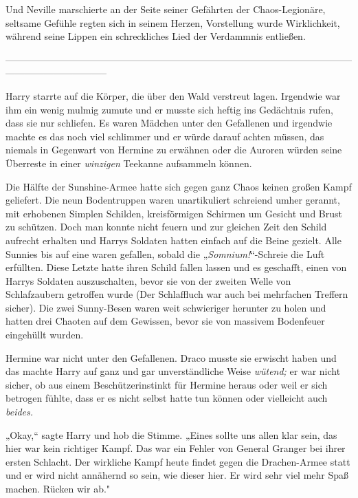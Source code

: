 {Und Neville marschierte an der Seite seiner Gefährten der Chaos-Legionäre, seltsame Gefühle regten sich in seinem Herzen, Vorstellung wurde Wirklichkeit, während seine Lippen ein schreckliches Lied der Verdammnis entließen.

--------------------------------------------------------------------------------------------------------------------------------------------

\hfill\break Harry starrte auf die Körper, die über den Wald verstreut lagen. Irgendwie war ihm ein wenig mulmig zumute und er musste sich heftig ins Gedächtnis rufen, dass sie nur schliefen. Es waren Mädchen unter den Gefallenen und irgendwie machte es das noch viel schlimmer und er würde darauf achten müssen, das niemals in Gegenwart von Hermine zu erwähnen oder die Auroren würden seine Überreste in einer \emph{winzigen} Teekanne aufsammeln können.

Die Hälfte der Sunshine-Armee hatte sich gegen ganz Chaos keinen großen Kampf geliefert. Die neun Bodentruppen waren unartikuliert schreiend umher gerannt, mit erhobenen Simplen Schilden, kreisförmigen Schirmen um Gesicht und Brust zu schützen. Doch man konnte nicht feuern und zur gleichen Zeit den Schild aufrecht erhalten und Harrys Soldaten hatten einfach auf die Beine gezielt. Alle Sunnies bis auf eine waren gefallen, sobald die „\emph{Somnium!}“-Schreie die Luft erfüllten. Diese Letzte hatte ihren Schild fallen lassen und es geschafft, einen von Harrys Soldaten auszuschalten, bevor sie von der zweiten Welle von Schlafzaubern getroffen wurde (Der Schlaffluch war auch bei mehrfachen Treffern sicher). Die zwei Sunny-Besen waren weit schwieriger herunter zu holen und hatten drei Chaoten auf dem Gewissen, bevor sie von massivem Bodenfeuer eingehüllt wurden.

Hermine war nicht unter den Gefallenen. Draco musste sie erwischt haben und das machte Harry auf ganz und gar unverständliche Weise \emph{wütend;} er war nicht sicher, ob aus einem Beschützerinstinkt für Hermine heraus oder weil er sich betrogen fühlte, dass er es nicht selbst hatte tun können oder vielleicht auch \emph{beides.}

„Okay,“ sagte Harry und hob die Stimme. „Eines sollte uns allen klar sein, das hier war kein richtiger Kampf. Das war ein Fehler von General Granger bei ihrer ersten Schlacht. Der wirkliche Kampf heute findet gegen die Drachen-Armee statt und er wird nicht annähernd so sein, wie dieser hier. Er wird sehr viel mehr Spaß machen. Rücken wir ab."

}
